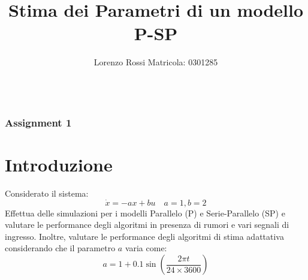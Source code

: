 \documentclass{beamer}
\title[Assignments 1]{Stima dei Parametri di un modello P-SP}
\author{Lorenzo Rossi Matricola: 0301285}
\begin{document}
\begin{frame}
\titlepage{}
\end{frame}
\begin{frame}
    \begin{columns}[t]
        \begin{column}{.5\textwidth}
            \tableofcontents[sections={1-3}]
        \end{column}
        \begin{column}{.5\textwidth}
            \tableofcontents[sections={4-5}]
        \end{column}
    \end{columns}
\end{frame}
\begin{frame}
    \frametitle{Assignment 1}
    \section{Introduzione}
    Considerato il sistema:
    \begin{equation*}
        \dot{x}=-ax+bu\quad a=1,b=2
    \end{equation*}
    Effettua delle simulazioni per i modelli Parallelo (P) e Serie-Parallelo (SP) e valutare le performance degli algoritmi in presenza di rumori e vari segnali di ingresso. Inoltre, valutare le performance degli algoritmi di stima adattativa considerando che il parametro \( a\) varia come:
    \begin{equation*}
        a=1+0.1\sin(\frac{2\pi t}{24\times 3600})
    \end{equation*}
\end{frame}
\end{document}
